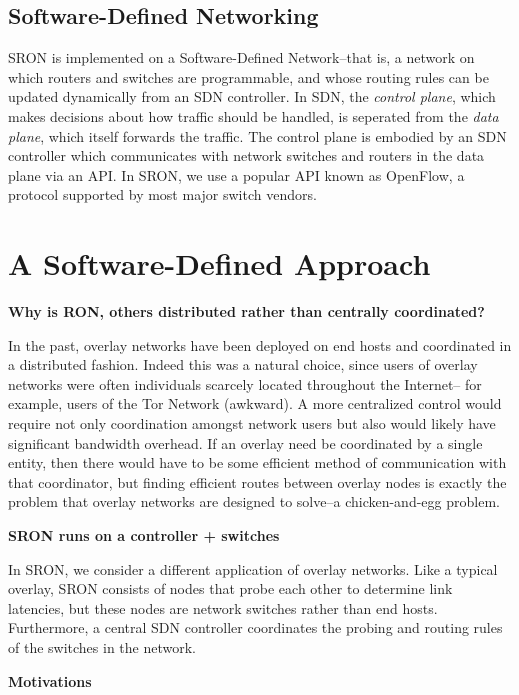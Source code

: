 \documentclass[pageno]{jpaper}
\begin{document}
\subsection{Software-Defined Networking}
SRON is implemented on a Software-Defined Network--that is, a network on which routers and switches are programmable, and whose routing rules can be updated dynamically from an SDN controller.  In SDN, the {\it control plane}, which makes decisions about how traffic should be handled, is seperated from the {\it data plane}, which itself forwards the traffic\cite{Feamster:2014:RSI:2602204.2602219}.  The control plane is embodied by an SDN controller which communicates with network switches and routers in the data plane via an API.  In SRON, we use a popular API known as OpenFlow\cite{McKeown:2008:OEI:1355734.1355746}, a protocol supported by most major switch vendors.  

\section{A Software-Defined Approach}

{\bf Why is RON, others distributed rather than centrally coordinated?}\bigskip

In the past, overlay networks have been deployed on end hosts and coordinated 
in a distributed fashion.  Indeed this was a natural choice, since users of 
overlay networks were often individuals scarcely located throughout the Internet--
for example, users of the Tor Network (awkward).  A more centralized control
would require not only coordination amongst network users but also would likely have 
significant bandwidth overhead.  If an overlay need be coordinated by a single entity,
then there would have to be some efficient method of communication with that coordinator, but 
finding efficient routes between overlay nodes is exactly the problem that overlay networks are designed to solve--a chicken-and-egg problem.  

{\bf SRON runs on a controller + switches}\bigskip

In SRON, we consider a different application of overlay networks. Like a typical overlay,
SRON consists of nodes that probe each other to determine link latencies, but these nodes
are network switches rather than end hosts. Furthermore, a central SDN controller coordinates 
the probing and routing rules of the switches in the network. 

{\bf Motivations}\bigskip
\end{document}
